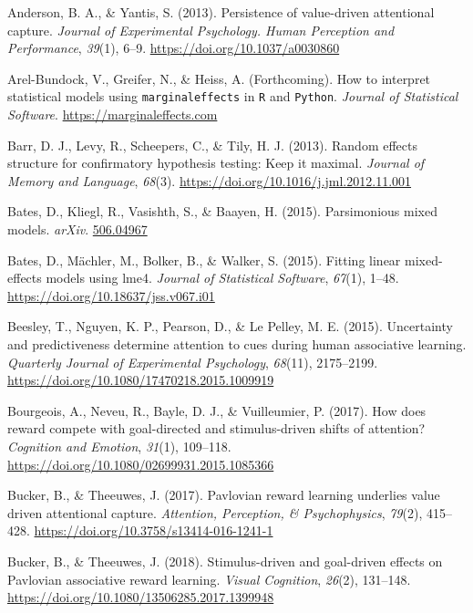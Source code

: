 \documentclass[
  man,
  floatsintext,
  longtable,
  nolmodern,
  notxfonts,
  notimes,
  mask,
  colorlinks=true,linkcolor=blue,citecolor=blue,urlcolor=blue]{apa7}
\newlength{\cslhangindent}
\newenvironment{CSLReferences}[2] %
 {\begin{list}{}{%
  \setlength{\itemindent}{0pt}
  \setlength{\leftmargin}{0pt}
  \setlength{\parsep}{0pt}
  \ifodd #1
   \setlength{\leftmargin}{\cslhangindent}
   \setlength{\itemindent}{-1\cslhangindent}
  \fi
  \setlength{\itemsep}{#2\baselineskip}}}
 {\end{list}}
\begin{document}
\begin{CSLReferences}{1}{0}
Anderson, B. A., \& Yantis, S. (2013). Persistence of value-driven
attentional capture. \emph{Journal of Experimental Psychology. Human
Perception and Performance}, \emph{39}(1), 6--9.
\url{https://doi.org/10.1037/a0030860}

Arel-Bundock, V., Greifer, N., \& Heiss, A. (Forthcoming). How to
interpret statistical models using \texttt{marginaleffects} in
\texttt{R} and \texttt{Python}. \emph{Journal of Statistical Software}.
\url{https://marginaleffects.com}

Barr, D. J., Levy, R., Scheepers, C., \& Tily, H. J. (2013). Random
effects structure for confirmatory hypothesis testing: Keep it maximal.
\emph{Journal of Memory and Language}, \emph{68}(3).
\url{https://doi.org/10.1016/j.jml.2012.11.001}

Bates, D., Kliegl, R., Vasishth, S., \& Baayen, H. (2015). Parsimonious
mixed models. \emph{arXiv}. \href{https://506.04967}{506.04967}

Bates, D., Mächler, M., Bolker, B., \& Walker, S. (2015). Fitting linear
mixed-effects models using {lme4}. \emph{Journal of Statistical
Software}, \emph{67}(1), 1--48.
\url{https://doi.org/10.18637/jss.v067.i01}

Beesley, T., Nguyen, K. P., Pearson, D., \& Le Pelley, M. E. (2015).
Uncertainty and predictiveness determine attention to cues during human
associative learning. \emph{Quarterly Journal of Experimental
Psychology}, \emph{68}(11), 2175--2199.
\url{https://doi.org/10.1080/17470218.2015.1009919}

Bourgeois, A., Neveu, R., Bayle, D. J., \& Vuilleumier, P. (2017). How
does reward compete with goal-directed and stimulus-driven shifts of
attention? \emph{Cognition and Emotion}, \emph{31}(1), 109--118.
\url{https://doi.org/10.1080/02699931.2015.1085366}

Bucker, B., \& Theeuwes, J. (2017). Pavlovian reward learning underlies
value driven attentional capture. \emph{Attention, Perception, \&
Psychophysics}, \emph{79}(2), 415--428.
\url{https://doi.org/10.3758/s13414-016-1241-1}

Bucker, B., \& Theeuwes, J. (2018). Stimulus-driven and goal-driven
effects on {Pavlovian} associative reward learning. \emph{Visual
Cognition}, \emph{26}(2), 131--148.
\url{https://doi.org/10.1080/13506285.2017.1399948}


\end{CSLReferences}
\end{document}
